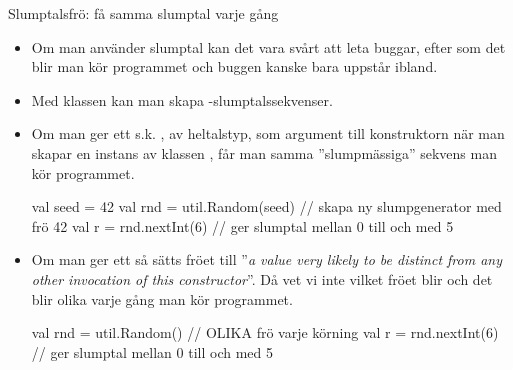 \begin{Slide}{Slumptalsfrö: få samma slumptal varje gång}\SlideFontTiny
	\begin{itemize}
		\item Om man använder slumptal kan det vara svårt att leta buggar, efter som det blir  man kör programmet och buggen kanske bara uppstår ibland.

		\item Med klassen  kan man skapa -slumptalssekvenser.
		      \pause
		\item Om man ger ett s.k.  , av heltalstyp, som argument till konstruktorn när man skapar en instans av klassen , får man samma ''slumpmässiga'' sekvens  man kör programmet.

		      \begin{Code}
			      val seed = 42
			      val rnd = util.Random(seed) // skapa ny slumpgenerator med frö 42
			      val r = rnd.nextInt(6) // ger slumptal mellan 0 till och med 5
		      \end{Code}
		      \pause
		\item Om man  ger ett  så sätts fröet till ''\emph{a value very likely to be distinct from any other invocation of this constructor}''. Då vet vi inte vilket fröet blir och det blir olika varje gång man kör programmet.
		      \begin{Code}
			      val rnd = util.Random() // OLIKA frö varje körning
			      val r = rnd.nextInt(6) // ger slumptal mellan 0 till och med 5
		      \end{Code}
		      \pause
	\end{itemize}
\end{Slide}

%
%
%
%

